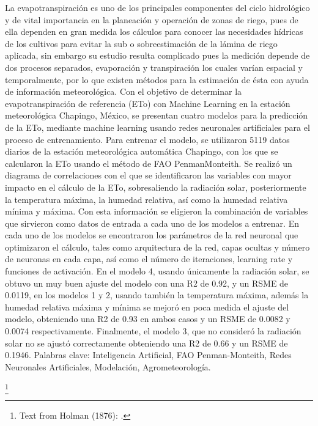 %
%

La evapotranspiración es uno de los principales componentes del ciclo
hidrológico y de vital importancia en la planeación y operación de zonas de riego,
pues de ella dependen en gran medida los cálculos para conocer las necesidades
hídricas de los cultivos para evitar la sub o sobreestimación de la lámina de riego
aplicada, sin embargo su estudio resulta complicado pues la medición depende
de dos procesos separados, evaporación y transpiración los cuales varían
espacial y temporalmente, por lo que existen métodos para la estimación de ésta
con ayuda de información meteorológica.
Con el objetivo de determinar la evapotranspiración de referencia (ETo) con
Machine Learning en la estación meteorológica Chapingo, México, se presentan
cuatro modelos para la predicción de la ETo, mediante machine learning usando
redes neuronales artificiales para el proceso de entrenamiento. Para entrenar el
modelo, se utilizaron 5119 datos diarios de la estación meteorológica automática
Chapingo, con los que se calcularon la ETo usando el método de FAO PenmanMonteith.
Se realizó un diagrama de correlaciones con el que se identificaron las variables
con mayor impacto en el cálculo de la ETo, sobresaliendo la radiación solar,
posteriormente la temperatura máxima, la humedad relativa, así como la
humedad relativa mínima y máxima. Con esta información se eligieron la
combinación de variables que sirvieron como datos de entrada a cada uno de los
modelos a entrenar.
En cada uno de los modelos se encontraron los parámetros de la red neuronal
que optimizaron el cálculo, tales como arquitectura de la red, capas ocultas y
número de neuronas en cada capa, así como el número de iteraciones, learning
rate y funciones de activación.
En el modelo 4, usando únicamente la radiación solar, se obtuvo un muy buen
ajuste del modelo con una R2 de 0.92, y un RSME de 0.0119, en los modelos 1 y
2, usando también la temperatura máxima, además la humedad relativa máxima
y mínima se mejoró en poca medida el ajuste del modelo, obteniendo una R2 de
0.93 en ambos casos y un RSME de 0.0082 y 0.0074 respectivamente.
Finalmente, el modelo 3, que no consideró la radiación solar no se ajustó
correctamente obteniendo una R2 de 0.66 y un RSME de 0.1946.
Palabras clave: Inteligencia Artificial, FAO Penman-Monteith, Redes Neuronales
Artificiales, Modelación, Agrometeorología.

\footnote{Text from Holman (1876): .}  
